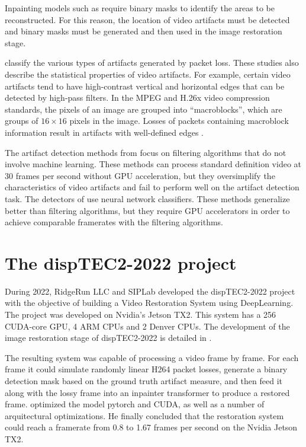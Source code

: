 Inpainting models such as \cite{Li2022} require binary masks to identify the areas to be reconstructed. For this reason, the location of video artifacts must be detected and binary masks must be generated and then used in the image restoration stage.

\cite{Greengrass2009, Glavota2016} classify the various types of artifacts generated by packet loss. These studies also describe the statistical properties of video artifacts. For example, certain video artifacts tend to have high-contrast vertical and horizontal edges that can be detected by high-pass filters. In the MPEG and H.26x video compression standards, the pixels of an image are grouped into ``macroblocks'', which are groups of $16 \times 16$ pixels in the image. Losses of packets containing macroblock information result in artifacts with well-defined edges \cite{Vranjes2019, Glavota2018}.

The artifact detection methods from \cite{Vranjes2018, Glavota2018} focus on filtering algorithms that do not involve machine learning. These methods can process standard definition video at 30 frames per second without GPU acceleration, but they oversimplify the characteristics of video artifacts and fail to perform well on the artifact detection task. The detectors of \cite{Goodall2019, Rajasekar2020} use neural network classifiers. These methods generalize better than filtering algorithms, but they require GPU accelerators in order to achieve comparable framerates with the filtering algorithms.

\section{The dispTEC2-2022 project}
\label{sec:intro_disptec}

During 2022, RidgeRun LLC and SIPLab developed the dispTEC2-2022 project with the objective of building a Video Restoration System using DeepLearning. The project was developed on Nvidia's Jetson TX2. This system has a 256 CUDA-core GPU, 4 ARM CPUs and 2 Denver CPUs. The development of the image restoration stage of dispTEC2-2022 is detailed in \cite{Brenes2022}.

The resulting system was capable of processing a video frame by frame. For each frame it could simulate randomly linear H264 packet losses, generate a binary detection mask based on the ground truth artifact measure, and then feed it along with the lossy frame into an inpainter transformer to produce a restored frame. \cite{Brenes2022} optimized the model pytorch and CUDA, as well as a number of arquitectural optimizations. He finally concluded that the restoration system could reach a framerate from 0.8 to 1.67 frames per second on the Nvidia Jetson TX2.

